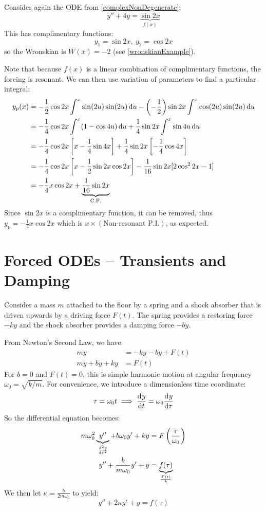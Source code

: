 \documentclass[../main.tex]{subfiles}
\begin{document}
\begin{example}
  Consider again the ODE from \cref{complexNonDegenerate}:
  \[
    y'' + 4y = \underbrace{\sin 2x}_{f(x)}
  \]
  This has complimentary functions:
  \[
    y_1 = \sin 2x,\ y_2 = \cos 2x
  \]
  so the Wronskian is $W(x) = -2$ (see \cref{wronskianExample}).

  Note that because $f(x)$ is a linear combination of complimentary functions, the forcing is resonant.
  We can then use variation of parameters to find a particular integral:
  \begin{align*}
    y_p(x) &= -\frac{1}{2}\cos2x \int_{}^{x} \sin(2u)\sin(2u) \d{u} - \left(-\frac{1}{2}\right)\sin2x \int_{}^{x} \cos(2u)\sin(2u) \d{u} \\
           &= -\frac{1}{4}\cos2x \int_{}^{x} (1-\cos 4u) \d{u} + \frac{1}{4} \sin2x \int_{}^{x} \sin 4u \d{u} \\
           &= -\frac{1}{4}\cos2x \left[x - \frac{1}{4}\sin4x\right] + \frac{1}{4}\sin2x \left[-\frac{1}{4}\cos 4x\right] \\
           &= -\frac{1}{4}\cos2x \left[x - \frac{1}{2}\sin2x\cos2x\right] - \frac{1}{16}\sin2x [2\cos^2 2x - 1] \\
           &= -\frac{1}{4}x\cos2x + \underbrace{\frac{1}{16}\sin2x}_{\text{C.F.}}
  \end{align*}
  Since $\sin2x$ is a complimentary function, it can be removed, thus $y_p = -\frac{1}{4}x\cos 2x$ which is $x \times (\text{Non-resonant P.I.})$, as expected.
\end{example}
\section{Forced ODEs -- Transients and Damping}
\label{forcedODEs}
Consider a mass $m$ attached to the floor by a spring and a shock absorber that is driven upwards by a driving force $F(t)$.
The spring provides a restoring force $-ky$ and the shock absorber provides a damping force $-b\dot{y}$.

From Newton's Second Law, we have:
\begin{align*}
  m\ddot{y} &= -ky - b\dot{y} + F(t) \\
  m\ddot{y} + b\dot{y} + ky &= F(t)
\end{align*}
For $b = 0$ and $F(t) = 0$, this is simple harmonic motion at angular frequency $\omega_0 = \sqrt{k/m}$.
For convenience, we introduce a dimensionless time coordinate:
\[
  \tau = \omega_0t \implies \deriv{y}{t} = \omega_0 \deriv{y}{\tau}
\]
So the differential equation becomes:
\begin{align*}
  m\omega^{2}_{0}\underbrace{y''}_{\deriv[2]{y}{\tau}} + b\omega_0 y' + ky &= F\left(\frac{\tau}{\omega_0}\right) \\
  y'' + \frac{b}{m \omega_0}y' + y &= \underbrace{f(\tau)}_{\frac{F(t)}{k}}
\end{align*}
We then let $\kappa = \frac{b}{2m\omega_0}$ to yield:
\[
  y'' + 2\kappa y' + y = f(\tau)
\]
\end{document}

